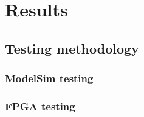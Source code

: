 \newpage
\chapter{Results}


\section{Testing methodology}


\subsection{ModelSim testing}

\subsection{FPGA testing}

